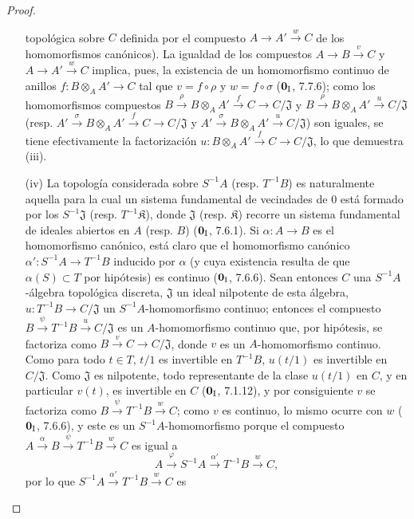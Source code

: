 \begin{proof}
\begin{enumerate}
  topológica sobre $C$ definida por el compuesto $A\to A'\xrightarrow{w}C$ de los
  homomorfismos canónicos). La igualdad de los compuestos $A\to B\xrightarrow{v}C$ y
  $A\to A'\xrightarrow{w}C$ implica, pues, la existencia de un homomorfismo
  continuo de anillos $f:B\otimes_A A'\to C$ tal que
  $v=f\circ\rho$ y $w=f\circ\sigma$ ($\mathbf 0_{\rm I}$, 7.7.6);
  como los homomorfismos compuestos
  $B\xrightarrow{\rho}B\otimes_A A'\xrightarrow{f}C\to C/\mathfrak J$
  y
  $B\xrightarrow{\rho}B\otimes_A A'\xrightarrow{u}C/\mathfrak J$
  (resp.
  $A'\xrightarrow{\sigma}B\otimes_A A'\xrightarrow{f}C\to C/\mathfrak J$
  y
  $A'\xrightarrow{\sigma}B\otimes_A A'\xrightarrow{u}C/\mathfrak J$)
  son iguales, se tiene efectivamente la factorización
  $u:B\otimes_A A'\xrightarrow{f}C\to C/\mathfrak J$, lo que demuestra
  (iii).
  \item[(iv)] La topología considerada sobre $S^{-1}A$ (resp. $T^{-1}B$) es
  naturalmente aquella para la cual un sistema fundamental de vecindades de
  $0$ está formado por los $S^{-1}\mathfrak J$ (resp. $T^{-1}\mathfrak K$), donde
  $\mathfrak J$ (resp. $\mathfrak K$) recorre un sistema fundamental
  de ideales abiertos en $A$ (resp. $B$) ($\mathbf 0_{\rm I}$, 7.6.1). Si
  $\alpha:A\to B$ es el homomorfismo canónico, está claro que
  el homomorfismo canónico $\alpha':S^{-1}A\to T^{-1}B$ inducido por
  $\alpha$ (y cuya existencia resulta de que $\alpha(S)\subset T$ por
  hipótesis) es continuo ($\mathbf 0_{\rm I}$, 7.6.6). Sean entonces $C$ una $S^{-1}A$-álgebra topológica
  discreta, $\mathfrak J$ un ideal nilpotente de esta álgebra,
  $u:T^{-1}B\to C/\mathfrak J$ un $S^{-1}A$-homomorfismo continuo; entonces
  el compuesto $B\xrightarrow{\psi}T^{-1}B\xrightarrow{u}C/\mathfrak J$ es un
  $A$-homomorfismo continuo que, por hipótesis, se factoriza como
  $B\xrightarrow{v}C\to C/\mathfrak J$, donde $v$ es un $A$-homomorfismo
  continuo. Como para todo $t\in T$, $t/1$ es invertible en $T^{-1}B$,
  $u(t/1)$ es invertible en $C/\mathfrak J$. Como $\mathfrak J$ es
  nilpotente, todo representante de la clase $u(t/1)$ en $C$, y en particular
  $v(t)$, es invertible en $C$ ($\mathbf 0_{\rm I}$, 7.1.12), y por consiguiente
  $v$ se factoriza como $B\xrightarrow{\psi}T^{-1}B\xrightarrow{w}C$; como $v$ es
  continuo, lo mismo ocurre con $w$ ($\mathbf 0_{\rm I}$, 7.6.6), y este es
  un $S^{-1}A$-homomorfismo porque el compuesto
  $A\xrightarrow{\alpha}B\xrightarrow{\psi}T^{-1}B\xrightarrow{w}C$ es igual a
  \[
    A\xrightarrow{\varphi}S^{-1}A\xrightarrow{\alpha'}T^{-1}B\xrightarrow{w}C,
  \]
  por lo que $S^{-1}A\xrightarrow{\alpha'}T^{-1}B\xrightarrow{w}C$ es

\end{enumerate}
\end{proof}
